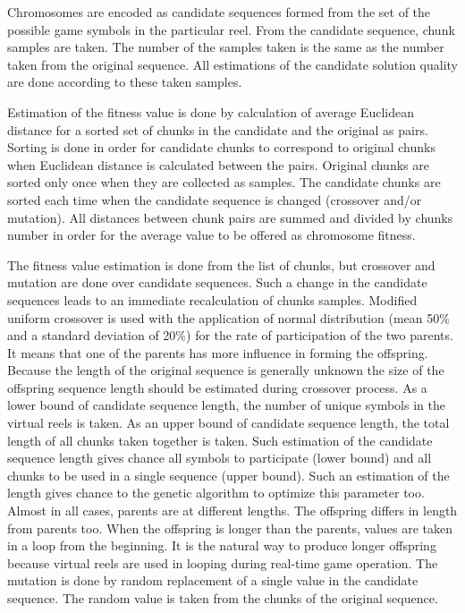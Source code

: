 \documentclass[11pt]{article}
\begin{document}
Chromosomes are encoded as candidate sequences formed from the set of the possible game symbols in the particular reel. From the candidate sequence, chunk samples are taken. The number of the samples taken is the same as the number taken from the original sequence. All estimations of the candidate solution quality are done according to these taken samples. 

Estimation of the fitness value is done by calculation of average Euclidean distance for a sorted set of chunks in the candidate and the original as pairs. Sorting is done in order for candidate chunks to correspond to original chunks when Euclidean distance is calculated between the pairs. Original chunks are sorted only once when they are collected as samples. The candidate chunks are sorted each time when the candidate sequence is changed (crossover and/or mutation). All distances between chunk pairs are summed and divided by chunks number in order for the average value to be offered as chromosome fitness. 

The fitness value estimation is done from the list of chunks, but crossover and mutation are done over candidate sequences. Such a change in the candidate sequences leads to an immediate recalculation of chunks samples. Modified uniform crossover is used with the application of normal distribution (mean 50\% and a standard deviation of 20\%) for the rate of participation of the two parents. It means that one of the parents has more influence in forming the offspring. Because the length of the original sequence is generally unknown the size of the offspring sequence length should be estimated during crossover process. As a lower bound of candidate sequence length, the number of unique symbols in the virtual reels is taken. As an upper bound of candidate sequence length, the total length of all chunks taken together is taken. Such estimation of the candidate sequence length gives chance all symbols to participate (lower bound) and all chunks to be used in a single sequence (upper bound). Such an estimation of the length gives chance to the genetic algorithm to optimize this parameter too. Almost in all cases, parents are at different lengths. The offspring differs in length from parents too. When the offspring is longer than the parents, values are taken in a loop from the beginning. It is the natural way to produce longer offspring because virtual reels are used in looping during real-time game operation. The mutation is done by random replacement of a single value in the candidate sequence. The random value is taken from the chunks of the original sequence. 
\end{document}
